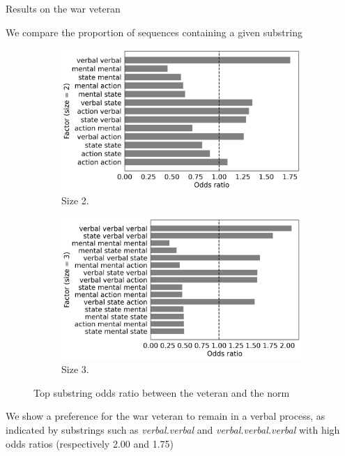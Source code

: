 \documentclass[handout,10pt]{beamer}
\begin{document}
\begin{frame}{Results on the war veteran}

We compare the proportion of sequences containing a given substring

\pause

\begin{figure}[!htb]
     \begin{subfigure}[b]{0.5\textwidth}
         \centering
         \includegraphics[scale=0.2]{img/viet_odds_2.png}
         \caption{Size 2.}
         \label{fig:viet_odds2}
     \end{subfigure}
         \begin{subfigure}[b]{0.4\textwidth}
         \centering
         \includegraphics[scale=0.2]{img/viet_odds_3.png}
         \caption{Size 3.}
         \label{fig:viet_odds3}
     \end{subfigure}
        \caption{Top substring odds ratio between the veteran and the norm}
        \label{fig:viet_odds}
\end{figure}

\pause


We show a preference for the war veteran to remain in a verbal process, as indicated by substrings such as \textit{verbal.verbal} and \textit{verbal.verbal.verbal} with high odds ratios (respectively 2.00 and 1.75)

\end{frame}
\end{document}
